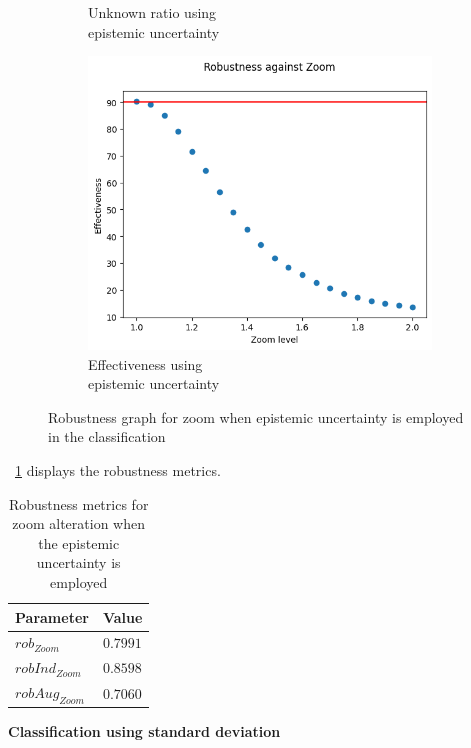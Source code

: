 \begin{figure}[h]
\begin{subfigure}{.33\textwidth}
		\caption{Unknown ratio using \\ epistemic uncertainty}
		\label{fig:zo_eu_unkn}
	\end{subfigure}%
	\begin{subfigure}{.33\textwidth}
		\centering
		\includegraphics[width=0.9\linewidth]{ImageFiles/EvalBNN/ZO/EU/eff}
		\caption{Effectiveness using \\ epistemic uncertainty}
		\label{fig:zo_eu_eff}
	\end{subfigure}
	\caption{Robustness graph for zoom when epistemic uncertainty is employed in the classification}
	\label{fig:zo_eu}
\end{figure}

\Tab~\ref{table:rob_zo_eu} displays the robustness metrics.

\begin{table}[h]
	\centering
	\begin{tabular}{|| l | l ||} 
		\hline
		\textbf{Parameter} & \textbf{Value} \\
		\hline
		\hline
		$rob_{Zoom}$ & $0.7991$ \\
		$robInd_{Zoom}$ & $0.8598$ \\
		$robAug_{Zoom}$ & $0.7060$ \\	
		\hline
	\end{tabular}	
	\caption{Robustness metrics for zoom alteration when the epistemic uncertainty is employed}
	\label{table:rob_zo_eu}
\end{table}

\vspace{0.3cm}
\textbf{Classification using standard deviation}
\vspace{0.1cm}

